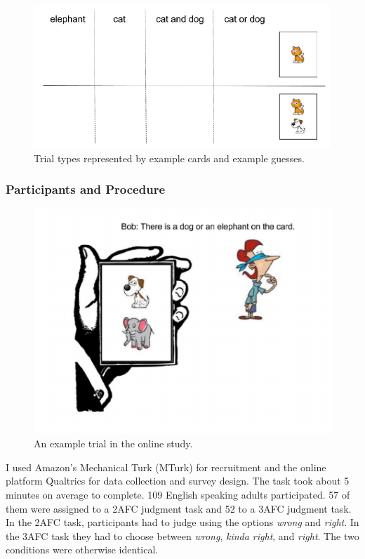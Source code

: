 \documentclass[oneside]{report}
\theoremstyle{definition}
\theoremstyle{definition}
\theoremstyle{definition}
\theoremstyle{remark}
\begin{document}
\begin{figure}[t]

{\centering \includegraphics{figs/trials-1} 

}

\caption{Trial types represented by example cards and example guesses.}\label{fig:trials}
\end{figure}
\subsubsection{Participants and
Procedure}\label{participants-and-procedure}
\begin{figure}[t]

{\centering \includegraphics{figs/exampleTrial-1} 

}

\caption{An example trial in the online study.}\label{fig:exampleTrial}
\end{figure}
I used Amazon's Mechanical Turk (MTurk) for recruitment and the online
platform Qualtrics for data collection and survey design. The task took
about 5 minutes on average to complete. 109 English speaking adults
participated. 57 of them were assigned to a 2AFC judgment task and 52 to
a 3AFC judgment task. In the 2AFC task, participants had to judge using
the options \emph{wrong} and \emph{right}. In the 3AFC task they had to
choose between \emph{wrong}, \emph{kinda right}, and \emph{right}. The
two conditions were otherwise identical.
\end{document}

